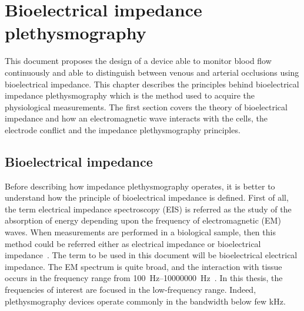 
\chapter{Bioelectrical impedance plethysmography}  %
\label{chapter impedance}

\ifpdf
    \graphicspath{{Chapter3/Figs/Raster/}{Chapter3/Figs/PDF/}{Chapter3/Figs/}}
\else
    \graphicspath{{Chapter3/Figs/Vector/}{Chapter3/Figs/}}
\fi

This document proposes the design of a device able to monitor blood flow continuously and able to distinguish between venous and arterial occlusions using bioelectrical impedance. This chapter describes the principles behind bioelectrical impedance plethysmography which is the method used to acquire the physiological measurements. The first section covers the theory of bioelectrical impedance and how an electromagnetic wave interacts with the cells, the electrode conflict and the impedance plethysmography principles. 



\section{Bioelectrical impedance}
Before describing how impedance plethysmography operates, it is better to understand how the principle of bioelectrical impedance is defined. First of all, the term electrical impedance spectroscopy (EIS) is referred as the study of the absorption of energy depending upon the frequency of electromagnetic (EM) waves. When measurements are performed in a biological sample, then this method could be referred either as electrical impedance or bioelectrical impedance~\cite{ivorra2003bioimpedance}. The term to be used in this document will be bioelectrical electrical impedance. The EM spectrum is quite broad, and the interaction with tissue occurs in the frequency range from \SIrange[scientific-notation = engineering]{100}{10000000}{\hertz}~\cite{bertemes2002tissue}. In this thesis, the frequencies of interest are focused in the low-frequency range. Indeed, plethysmography devices operate commonly in the bandwidth below few \si{\kilo\hertz}.

